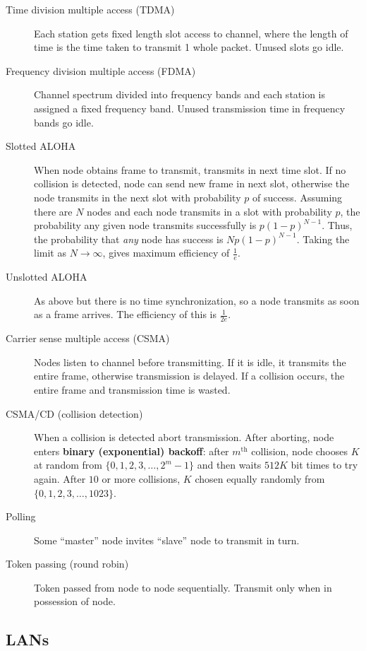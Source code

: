 \documentclass{article}
\begin{document}
\begin{description}
    \item[Time division multiple access (TDMA)] Each station gets fixed length slot access to channel,
    where the length of time is the time taken to transmit 1 whole packet. Unused slots go idle.
    \item[Frequency division multiple access (FDMA)] Channel spectrum divided into frequency bands and 
    each station is assigned a fixed frequency band. Unused transmission time in frequency bands go idle.
    \item[Slotted ALOHA] When node obtains frame to transmit, transmits in next time slot. If no 
    collision is detected, node can send new frame in next slot, otherwise the node transmits in the 
    next slot with probability $p$ of success. Assuming there are $N$ nodes and each node transmits in a
    slot with probability $p$, the probability any given node transmits successfully is $p(1-p)^{N-1}$.
    Thus, the probability that \textit{any} node has success is $Np(1-p)^{N-1}$. Taking the limit as
    $N\to\infty$, gives maximum efficiency of $\frac1e$.
    \item[Unslotted ALOHA] As above but there is no time synchronization, so a node transmits as soon as
    a frame arrives. The efficiency of this is $\frac1{2e}$.
    \item[Carrier sense multiple access (CSMA)] Nodes listen to channel before transmitting. If it is idle,
    it transmits the entire frame, otherwise transmission is delayed. If a collision occurs, the entire
    frame and transmission time is wasted.
    \item[CSMA/CD (collision detection)] When a collision is detected abort transmission. After aborting,
    node enters \textbf{binary (exponential) backoff}: after $m^\text{th}$ collision, node chooses $K$
    at random from $\{0,1,2,3, \ldots,2^m-1\}$ and then waits $512K$ bit times to try again. After $10$ or 
    more collisions, $K$ chosen equally randomly from $\{0,1,2,3,\dots,1023\}$.
    \item[Polling] Some ``master'' node invites ``slave'' node to transmit in turn.
    \item[Token passing (round robin)] Token passed from node to node sequentially. Transmit only when
    in possession of node.
\end{description}

\subsection*{LANs}
\end{document}
